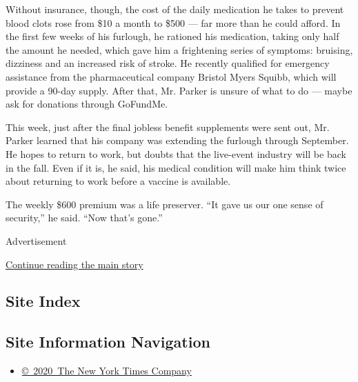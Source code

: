 Without insurance, though, the cost of the daily medication he takes to
prevent blood clots rose from \$10 a month to \$500 --- far more than he
could afford. In the first few weeks of his furlough, he rationed his
medication, taking only half the amount he needed, which gave him a
frightening series of symptoms: bruising, dizziness and an increased
risk of stroke. He recently qualified for emergency assistance from the
pharmaceutical company Bristol Myers Squibb, which will provide a 90-day
supply. After that, Mr. Parker is unsure of what to do --- maybe ask for
donations through GoFundMe.

This week, just after the final jobless benefit supplements were sent
out, Mr. Parker learned that his company was extending the furlough
through September. He hopes to return to work, but doubts that the
live-event industry will be back in the fall. Even if it is, he said,
his medical condition will make him think twice about returning to work
before a vaccine is available.

The weekly \$600 premium was a life preserver. ``It gave us our one
sense of security,'' he said. ``Now that's gone.''

Advertisement

\protect\hyperlink{after-bottom}{Continue reading the main story}

\hypertarget{site-index}{%
\subsection{Site Index}\label{site-index}}

\hypertarget{site-information-navigation}{%
\subsection{Site Information
Navigation}\label{site-information-navigation}}

\begin{itemize}
\tightlist
\item
  \href{https://help.nytimes.com/hc/en-us/articles/115014792127-Copyright-notice}{©~2020~The
  New York Times Company}
\end{itemize}

